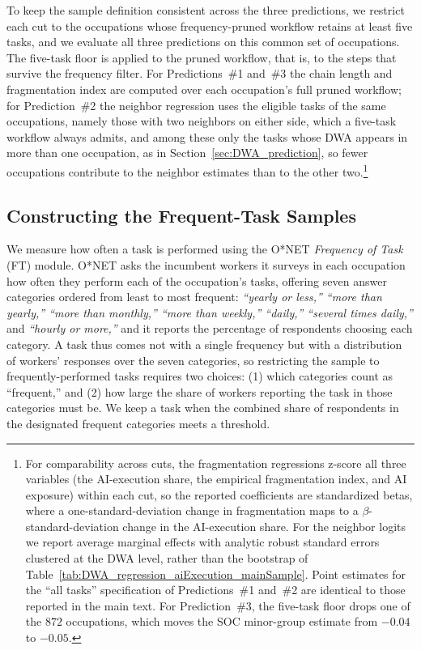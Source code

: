 To keep the sample definition consistent across the three predictions, we restrict each cut to the occupations whose frequency-pruned workflow retains at least five tasks, and we evaluate all three predictions on this common set of occupations.
The five-task floor is applied to the pruned workflow, that is, to the steps that survive the frequency filter.
For Predictions~\#1 and~\#3 the chain length and fragmentation index are computed over each occupation's full pruned workflow; for Prediction~\#2 the neighbor regression uses the eligible tasks of the same occupations, namely those with two neighbors on either side, which a five-task workflow always admits, and among these only the tasks whose DWA appears in more than one occupation, as in Section~\ref{sec:DWA_prediction}, so fewer occupations contribute to the neighbor estimates than to the other two.\footnote{For comparability across cuts, the fragmentation regressions z-score all three variables (the AI-execution share, the empirical fragmentation index, and AI exposure) within each cut, so the reported coefficients are standardized betas, where a one-standard-deviation change in fragmentation maps to a $\beta$-standard-deviation change in the AI-execution share. For the neighbor logits we report average marginal effects with analytic robust standard errors clustered at the DWA level, rather than the bootstrap of Table~\ref{tab:DWA_regression_aiExecution_mainSample}. Point estimates for the ``all tasks'' specification of Predictions~\#1 and~\#2 are identical to those reported in the main text. For Prediction~\#3, the five-task floor drops one of the $872$ occupations, which moves the SOC minor-group estimate from $-0.04$ to $-0.05$.}

\subsection{Constructing the Frequent-Task Samples}
\label{app:frequency_robustness_construction}

We measure how often a task is performed using the O*NET \emph{Frequency of Task} (FT) module.
O*NET asks the incumbent workers it surveys in each occupation how often they perform each of the occupation's tasks, offering seven answer categories ordered from least to most frequent: \textit{``yearly or less,'' ``more than yearly,'' ``more than monthly,'' ``more than weekly,'' ``daily,'' ``several times daily,''} and \textit{``hourly or more,''} and it reports the percentage of respondents choosing each category.
A task thus comes not with a single frequency but with a distribution of workers' responses over the seven categories, so restricting the sample to frequently-performed tasks requires two choices: (1) which categories count as ``frequent,'' and (2) how large the share of workers reporting the task in those categories must be.
We keep a task when the combined share of respondents in the designated frequent categories meets a threshold.

